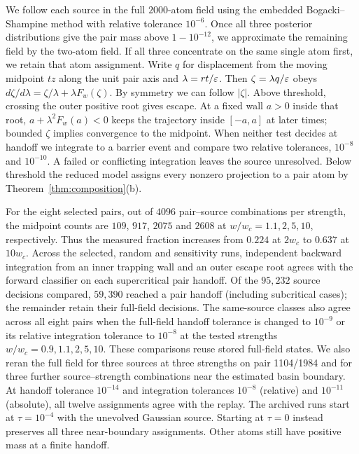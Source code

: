 \documentclass{article} %
\theoremstyle{plain}
\theoremstyle{definition}
\theoremstyle{remark}
\begin{document}
We follow each source in the full $2000$-atom field using the embedded Bogacki--Shampine
method with relative tolerance $10^{-6}$. Once all three posterior distributions give the
pair mass above $1-10^{-12}$, we approximate the remaining field by the two-atom field.
If all three concentrate on the same single atom first, we retain that atom assignment.
Write $q$ for displacement from the moving midpoint $tz$ along the unit pair axis and
$\lambda=rt/\varepsilon$. Then $\zeta=\lambda q/\varepsilon$ obeys
$d\zeta/d\lambda=\zeta/\lambda+\lambda F_w(\zeta)$. By symmetry we can follow $|\zeta|$.
Above threshold, crossing the outer positive root gives escape. At a fixed wall $a>0$
inside that root, $a+\lambda^2 F_w(a)<0$ keeps the trajectory inside $[-a,a]$
at later times; bounded $\zeta$ implies convergence to the midpoint.
When neither test decides at handoff we integrate to a barrier event and compare two
relative tolerances, $10^{-8}$ and $10^{-10}$. A failed or conflicting integration
leaves the source unresolved. Below threshold the reduced model assigns every nonzero
projection to a pair atom by Theorem~\ref{thm:composition}(b).

For the eight selected pairs, out of $4096$ pair--source combinations per strength, the midpoint counts are
$109$, $917$, $2075$ and $2608$ at $w/w_c=1.1,2,5,10$, respectively.
Thus the measured fraction increases from $0.224$ at $2w_c$ to $0.637$ at $10w_c$.
Across the selected, random and sensitivity runs, independent backward integration
from an inner trapping wall and an outer escape root agrees with the forward classifier
on each supercritical pair handoff. Of the $95{,}232$ source decisions compared,
$59{,}390$ reached a pair handoff (including subcritical cases); the remainder
retain their full-field decisions. The same-source classes also
agree across all eight pairs when the full-field handoff tolerance is changed to $10^{-9}$
or its relative integration tolerance to $10^{-8}$ at the tested strengths
$w/w_c=0.9,1.1,2,5,10$. These comparisons reuse stored full-field states. We also reran the full field for
three sources at three strengths on pair 1104/1984 and for three further
source--strength combinations near the estimated basin boundary. At handoff
tolerance $10^{-14}$ and integration tolerances $10^{-8}$ (relative) and $10^{-11}$
(absolute), all twelve assignments agree with the replay. The archived runs start at
$\tau=10^{-4}$ with the unevolved Gaussian source. Starting at $\tau=0$ instead preserves
all three near-boundary assignments. Other atoms still
have positive mass at a finite handoff.
\end{document}
